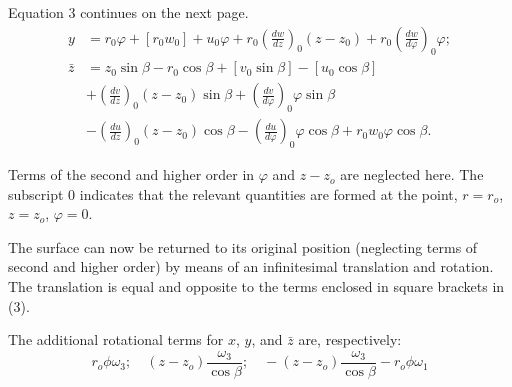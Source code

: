 \documentclass{amsart}
\begin{document}
Equation 3 continues on the next page.  \setcounter{equation}{2}
\begin{equation}\label{eq3p731}
\begin{aligned}
y & =r_0 \varphi+\left[r_0 w_0\right]+u_0 \varphi+r_0\left(\frac{d w}{d z}\right)_0\left(z-z_0\right)+r_0\left(\frac{d w}{d \varphi}\right)_0 \varphi; \\
\bar{z} & =z_0 \sin \beta-r_0 \cos \beta+\left[v_0 \sin \beta\right]-\left[u_0 \cos \beta\right] \\
& +\left(\frac{d v}{d z}\right)_0\left(z-z_0\right) \sin \beta+\left(\frac{d v}{d \varphi}\right)_0 \varphi \sin \beta \\
& -\left(\frac{d u}{d z}\right)_0\left(z-z_0\right) \cos \beta-\left(\frac{d u}{d \varphi}\right)_0 \varphi \cos \beta+r_0 w_0 \varphi \cos \beta .
\end{aligned}
\end{equation}

Terms of the second and higher order in \(\varphi\) and \(z-z_o\) are neglected
here.  The subscript \(0\) indicates that the relevant quantities are formed at
the point, \(r = r_o\), \(z = z_o\), \(\varphi = 0\).

The surface can now be returned to its original position (neglecting terms of
second and higher order) by means of an infinitesimal translation and rotation.
The translation is equal and opposite to the terms enclosed in square brackets in (3).

The additional rotational terms for \(x\), \(y\), and
\(\bar{z}\) are, respectively:
\[r_o \phi \omega_3;\quad (z - z_o)
\frac{\omega_3}{\cos \beta};\quad -(z - z_o)
\frac{\omega_3}{\cos \beta} - r_o \phi \omega_1\]
\end{document}
